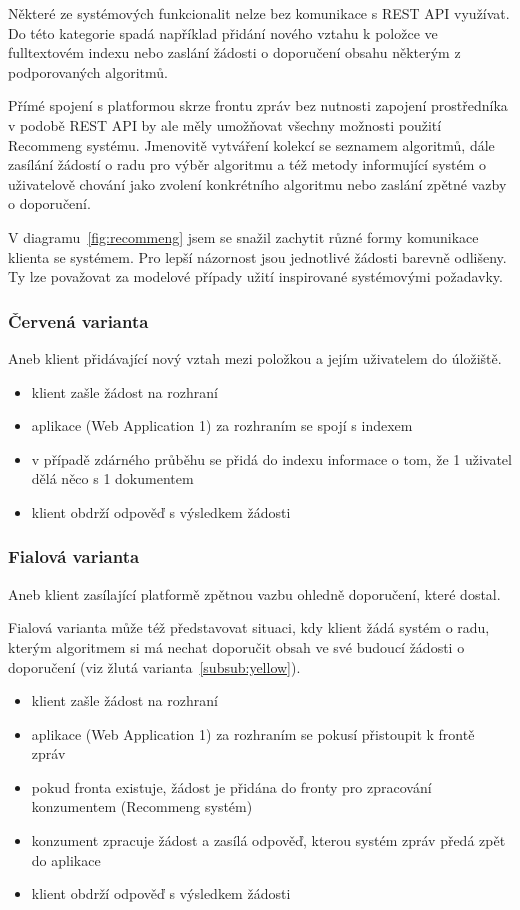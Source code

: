 \documentclass[thesis=M,czech]{FITthesis}[2014/05/07]
\begin{document}
Některé ze systémových funkcionalit nelze bez komunikace s REST API využívat. Do této kategorie spadá například přidání nového vztahu k položce ve fulltextovém indexu nebo zaslání žádosti o doporučení obsahu některým z podporovaných algoritmů. 

Přímé spojení s platformou skrze frontu zpráv bez nutnosti zapojení prostředníka v podobě REST API by ale měly umožňovat všechny možnosti použití Recommeng systému. Jmenovitě vytváření kolekcí se seznamem algoritmů, dále zasílání žádostí o radu pro výběr algoritmu a též metody informující systém o uživatelově chování jako zvolení konkrétního algoritmu nebo zaslání zpětné vazby o doporučení. 

V diagramu~\ref{fig:recommeng} jsem se snažil zachytit různé formy komunikace klienta se systémem. Pro lepší názornost jsou jednotlivé žádosti barevně odlišeny. Ty lze považovat za modelové případy užití inspirované systémovými požadavky.

\subsubsection{Červená varianta}

Aneb klient přidávající nový vztah mezi položkou a jejím uživatelem do úložiště.

\begin{itemize}
	\item klient zašle žádost na rozhraní
	\item aplikace (Web Application 1) za rozhraním se spojí s indexem
	\item v případě zdárného průběhu se přidá do indexu informace o tom, že 1 uživatel dělá něco s 1 dokumentem
	\item klient obdrží odpověď s výsledkem žádosti
\end{itemize}

\subsubsection{Fialová varianta}
\label{subsub:purple}

Aneb klient zasílající platformě zpětnou vazbu ohledně doporučení, které dostal.

Fialová varianta může též představovat situaci, kdy klient žádá systém o radu, kterým algoritmem si má nechat doporučit obsah ve své budoucí žádosti o doporučení (viz žlutá varianta~\ref{subsub:yellow}).

\begin{itemize}
	\item klient zašle žádost na rozhraní
	\item aplikace (Web Application 1) za rozhraním se pokusí přistoupit k frontě zpráv
	\item pokud fronta existuje, žádost je přidána do fronty pro zpracování konzumentem (Recommeng systém)
	\item konzument zpracuje žádost a zasílá odpověď, kterou systém zpráv předá zpět do aplikace
	\item klient obdrží odpověď s výsledkem žádosti
\end{itemize}
\end{document}
